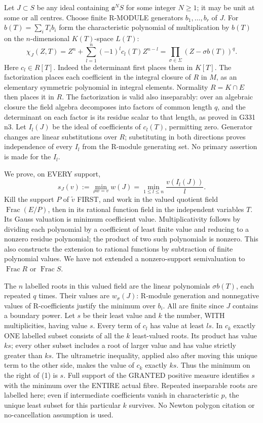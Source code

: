 \documentclass[11pt]{article}
\begin{document}
Let $J\subset S$ be any ideal containing $\mathfrak a^N S$ for some
integer $N\ge1$; it may be unit at some or all centres. Choose finite
R-MODULE generators $b_1,\ldots,b_r$ of $J$. For
$b(T)=\sum_iT_ib_i$ form the characteristic polynomial of multiplication
by $b(T)$ on the $n$-dimensional $K(T)$-space $L(T)$:
\[
 \chi_J(Z,T)=Z^n+\sum_{l=1}^n(-1)^l c_l(T)Z^{n-l}
           =\prod_{\sigma\in\Sigma}(Z-\sigma b(T))^q.
\]
Here $c_l\in R[T]$. Indeed the determinant first places them in $K[T]$.
The factorization places each coefficient in the integral closure of $R$
in $M$, as an elementary symmetric polynomial in integral elements.
Normality $R=K\cap E$ then places it in $R$. The factorization is valid
also inseparably: over an algebraic closure the field algebra decomposes
into factors of common length $q$, and the determinant on each factor
is its residue scalar to that length, as proved in G331 n3.
Let $I_l(J)$ be the ideal of coefficients of $c_l(T)$, permitting zero.
Generator changes are linear substitutions over $R$; substituting in
both directions proves independence of every $I_l$ from the R-module
generating set. No primary assertion is made for the $I_l$.

We prove, on EVERY support,
\[
 s_J(v):=\min_{\rho w=v}w(J)
       =\min_{1\le l\le n}\frac{v(I_l(J))}{l}.                 \tag{1}
\]
Kill the support $P$ of $\widetilde v$ FIRST, and work in the valued
quotient field $\operatorname{Frac}(E/P)$, then in its rational function
field in the independent variables $T$. Its Gauss valuation is minimum
coefficient value. Multiplicativity follows by dividing each polynomial
by a coefficient of least finite value and reducing to a nonzero residue
polynomial; the product of two such polynomials is nonzero. This also
constructs the extension to rational functions by subtraction of finite
polynomial values. We have not extended a nonzero-support semivaluation
to $\operatorname{Frac}R$ or $\operatorname{Frac}S$.

The $n$ labelled roots in this valued field are the linear polynomials
$\sigma b(T)$, each repeated $q$ times. Their values are $w_\sigma(J)$:
R-module generation and nonnegative values of R-coefficients justify the
minimum over $b_i$. All are finite since $J$ contains a boundary power.
Let $s$ be their least value and $k$ the number, WITH multiplicities,
having value $s$. Every term of $c_l$ has value at least $ls$.
In $c_k$ exactly ONE labelled subset consists of all the $k$ least-valued
roots. Its product has value $ks$; every other subset includes a root
of larger value and has value strictly greater than $ks$.
The ultrametric inequality, applied also after moving this unique term
to the other side, makes the value of $c_k$ exactly $ks$.
Thus the minimum on the right of (1) is $s$.
Full support of the GRANTED positive measure identifies $s$ with the
minimum over the ENTIRE actual fibre. Repeated inseparable roots are
labelled here; even if intermediate coefficients vanish in characteristic
$p$, the unique least subset for this particular $k$ survives. No Newton
polygon citation or no-cancellation assumption is used.
\end{document}
